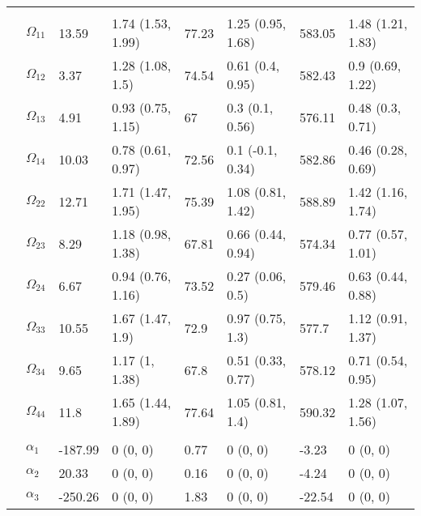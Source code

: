 \documentclass[]{article}
\begin{document}
\begin{table}[t]
\begin{tabular}{llllllll}
\addlinespace[0.3em]
\multicolumn{8}{l}{\textbf{ }}\\
\hspace{1em} & $\Omega_{11}$ & 13.59 & 1.74 (1.53, 1.99) & 77.23 & 1.25 (0.95, 1.68) & 583.05 & 1.48 (1.21, 1.83)\\
\hspace{1em} & $\Omega_{12}$ & 3.37 & 1.28 (1.08, 1.5) & 74.54 & 0.61 (0.4, 0.95) & 582.43 & 0.9 (0.69, 1.22)\\
\hspace{1em} & $\Omega_{13}$ & 4.91 & 0.93 (0.75, 1.15) & 67 & 0.3 (0.1, 0.56) & 576.11 & 0.48 (0.3, 0.71)\\
\hspace{1em} & $\Omega_{14}$ & 10.03 & 0.78 (0.61, 0.97) & 72.56 & 0.1 (-0.1, 0.34) & 582.86 & 0.46 (0.28, 0.69)\\
\hspace{1em} & $\Omega_{22}$ & 12.71 & 1.71 (1.47, 1.95) & 75.39 & 1.08 (0.81, 1.42) & 588.89 & 1.42 (1.16, 1.74)\\
\hspace{1em} & $\Omega_{23}$ & 8.29 & 1.18 (0.98, 1.38) & 67.81 & 0.66 (0.44, 0.94) & 574.34 & 0.77 (0.57, 1.01)\\
\hspace{1em} & $\Omega_{24}$ & 6.67 & 0.94 (0.76, 1.16) & 73.52 & 0.27 (0.06, 0.5) & 579.46 & 0.63 (0.44, 0.88)\\
\hspace{1em} & $\Omega_{33}$ & 10.55 & 1.67 (1.47, 1.9) & 72.9 & 0.97 (0.75, 1.3) & 577.7 & 1.12 (0.91, 1.37)\\
\hspace{1em} & $\Omega_{34}$ & 9.65 & 1.17 (1, 1.38) & 67.8 & 0.51 (0.33, 0.77) & 578.12 & 0.71 (0.54, 0.95)\\
\hspace{1em} & $\Omega_{44}$ & 11.8 & 1.65 (1.44, 1.89) & 77.64 & 1.05 (0.81, 1.4) & 590.32 & 1.28 (1.07, 1.56)\\
\addlinespace[0.3em]
\multicolumn{8}{l}{\textbf{ }}\\
\hspace{1em} & $\alpha_{1}$ & -187.99 & 0 (0, 0) & 0.77 & 0 (0, 0) & -3.23 & 0 (0, 0)\\
\hspace{1em} & $\alpha_{2}$ & 20.33 & 0 (0, 0) & 0.16 & 0 (0, 0) & -4.24 & 0 (0, 0)\\
\hspace{1em} & $\alpha_{3}$ & -250.26 & 0 (0, 0) & 1.83 & 0 (0, 0) & -22.54 & 0 (0, 0)\\

\end{tabular}
\end{table}
\end{document}
